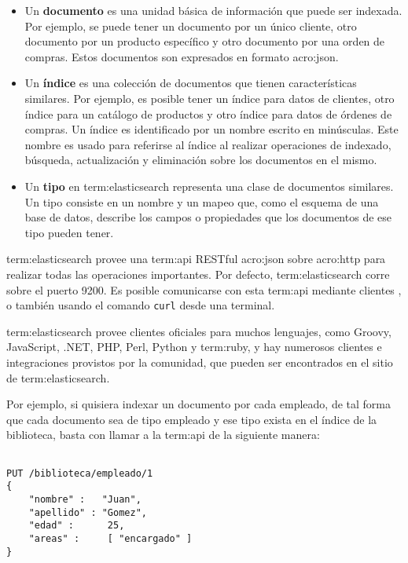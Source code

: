\begin{itemize}
   
\item
Un \textbf{documento} es una unidad básica de información que puede ser indexada. Por
ejemplo, se puede tener un documento por un único cliente, otro documento por
un producto específico y otro documento por una orden de compras. Estos
documentos son expresados en formato \gls{acro:json}.

\item
Un \textbf{índice} es una colección de documentos que tienen características similares.
Por ejemplo, es posible tener un índice para datos de clientes, otro índice para
un catálogo de productos y otro índice para datos de órdenes de compras. Un
índice es identificado por un nombre escrito en minúsculas. Este nombre es usado
para referirse al índice al realizar operaciones de indexado, búsqueda,
actualización y eliminación sobre los documentos en el mismo.

\item
Un \textbf{tipo} en \gls{term:elasticsearch} representa una clase de documentos
similares. Un tipo consiste en un nombre y un mapeo que, como el esquema de una
base de datos, describe los campos o propiedades que los documentos de ese tipo
pueden tener.

\end{itemize}

\gls{term:elasticsearch} provee una \gls{term:api} RESTful \gls{acro:json} sobre
\gls{acro:http} para realizar todas las operaciones importantes. Por defecto,
\gls{term:elasticsearch} corre sobre el puerto 9200. Es posible comunicarse con
esta \gls{term:api} mediante clientes , o también usando el comando
\texttt{curl} desde una terminal.

\gls{term:elasticsearch} provee clientes oficiales para muchos lenguajes, como
Groovy, JavaScript, .NET, PHP, Perl, Python y \gls{term:ruby}, y hay numerosos
clientes e integraciones provistos por la comunidad, que pueden ser encontrados
en el sitio  de \gls{term:elasticsearch}.

Por ejemplo, si quisiera indexar un documento por cada empleado, de tal forma
que cada documento sea de tipo empleado y ese tipo exista en el índice de la
biblioteca, basta con llamar a la \gls{term:api} de la siguiente manera:

\begin{lstlisting}

PUT /biblioteca/empleado/1
{
    "nombre" :   "Juan",
    "apellido" : "Gomez",
    "edad" :      25,
    "areas" :     [ "encargado" ]
}

\end{lstlisting}


